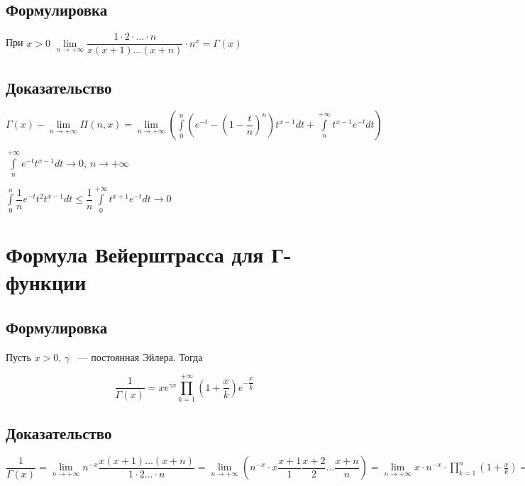 \documentclass{article}
\begin{document}
        \subsection{Формулировка}
        
            При $x > 0$ $\lim\limits_{n \rightarrow +\infty} \dfrac{1 \cdot 2 \cdot \ldots \cdot n}{x(x+1)\ldots(x+n)} \cdot n^x = \Gamma(x)$
            
        \subsection{Доказательство}
        
            $\Gamma(x) - \lim\limits_{n \rightarrow +\infty} \Pi(n, x) = \lim\limits_{n \rightarrow +\infty} \left( \int\limits^n_0 \left(e^{-t} - \left(1 - \dfrac{t}{n} \right)^n \right) t^{x - 1} dt + \int\limits^{+\infty}_n t^{x - 1} e^{-t} dt \right)$
            
            $\int\limits^{+\infty}_n e^{-t} t^{x - 1} dt \rightarrow 0$, $n \rightarrow +\infty$
            
            $\int\limits^n_0 \dfrac{1}{n} e^{-t} t^2 t^{x - 1} dt \leq \dfrac{1}{n} \int\limits^{+\infty}_0 t^{x + 1}e^{-t}dt \rightarrow 0$
            
    \newpage
    
    \section{Формула Вейерштрасса для Г-функции}
    
        \subsection{Формулировка}
        
            Пусть $x > 0$, $\gamma$ ~--- постоянная Эйлера. Тогда
            
            $$\dfrac{1}{\Gamma(x)} = x e^{\gamma x} \prod\limits^{+\infty}_{k = 1} \left( 1 + \dfrac{x}{k} \right) e^{-\dfrac{x}{k}}$$
            
        \subsection{Доказательство}
        
            $\dfrac{1}{\Gamma(x)} = \lim\limits_{n \rightarrow +\infty} n^{-x} \dfrac{x(x+1)\ldots(x+n)}{1 \cdot 2 \ldots \cdot n} = \lim\limits_{n \rightarrow +\infty} \left( n^{-x} \cdot x \dfrac{x + 1}{1} \dfrac{x + 2}{2} \ldots \dfrac{x + n}{n} \right) = \lim\limits_{n \rightarrow +\infty} x \cdot n^{-x} \cdot \prod^n_{k = 1} \left( 1 + \frac{x}{k} \right) = \lim\limits_{n \rightarrow +\infty} x e^{x \left(1 + \frac{1}{2} + \ldots + \frac{1}{n} \right)} \cdot e^{-x \ln n} \prod^n_{k = 1} \left( 1 + \dfrac{x}{k} \right) e^{-\frac{x}{k}} = x \cdot e^{\gamma} \prod^{+\infty}_{k = 1} \left( 1 + \dfrac{x}{k} \right) e^{-\frac{x}{k}}$
            
\end{document}
